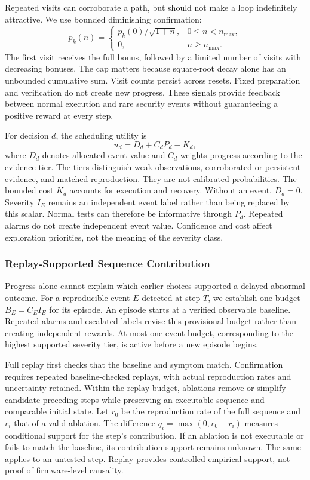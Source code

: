 \documentclass[10pt,journal,compsoc]{IEEEtran}
\begin{document}
Repeated visits can corroborate a path, but should not make a loop indefinitely attractive. We use bounded diminishing confirmation:
\begin{equation}
p_k(n)=
\begin{cases}
p_k(0)/\sqrt{1+n}, & 0\le n<n_{\max},\\
0, & n\ge n_{\max}.
\end{cases}
\label{eq:progress-decay}
\end{equation}
The first visit receives the full bonus, followed by a limited number of visits with decreasing bonuses. The cap matters because square-root decay alone has an unbounded cumulative sum. Visit counts persist across resets. Fixed preparation and verification do not create new progress. These signals provide feedback between normal execution and rare security events without guaranteeing a positive reward at every step.

For decision $d$, the scheduling utility is
\begin{equation}
u_d=D_d+C_dP_d-K_d,
\label{eq:utility}
\end{equation}
where $D_d$ denotes allocated event value and $C_d$ weights progress according to the evidence tier. The tiers distinguish weak observations, corroborated or persistent evidence, and matched reproduction. They are not calibrated probabilities. The bounded cost $K_d$ accounts for execution and recovery. Without an event, $D_d=0$. Severity $I_E$ remains an independent event label rather than being replaced by this scalar. Normal tests can therefore be informative through $P_d$. Repeated alarms do not create independent event value. Confidence and cost affect exploration priorities, not the meaning of the severity class.

\subsubsection{Replay-Supported Sequence Contribution}
Progress alone cannot explain which earlier choices supported a delayed abnormal outcome. For a reproducible event $E$ detected at step $T$, we establish one budget $B_E=C_EI_E$ for its episode. An episode starts at a verified observable baseline. Repeated alarms and escalated labels revise this provisional budget rather than creating independent rewards. At most one event budget, corresponding to the highest supported severity tier, is active before a new episode begins.

Full replay first checks that the baseline and symptom match. Confirmation requires repeated baseline-checked replays, with actual reproduction rates and uncertainty retained. Within the replay budget, ablations remove or simplify candidate preceding steps while preserving an executable sequence and comparable initial state. Let $r_0$ be the reproduction rate of the full sequence and $r_i$ that of a valid ablation. The difference $q_i=\max(0,r_0-r_i)$ measures conditional support for the step's contribution. If an ablation is not executable or fails to match the baseline, its contribution support remains unknown. The same applies to an untested step. Replay provides controlled empirical support, not proof of firmware-level causality.
\end{document}
